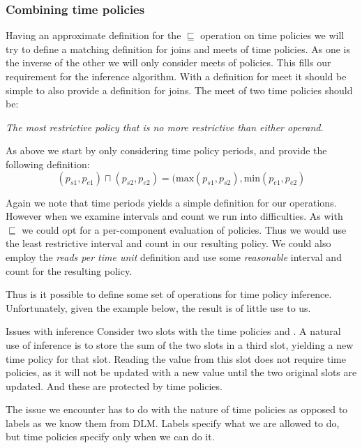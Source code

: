 \subsubsection{Combining time policies}
Having an approximate definition for the $\sqsubseteq$ operation on time policies we will try to define a matching definition for joins and meets of time policies.
As one is the inverse of the other we will only consider meets of policies.
This fills our requirement for the inference algorithm.
With a definition for meet it should be simple to also provide a definition for joins.
The meet of two time policies should be:
\begin{center}
  \textit{The most restrictive policy that is no more restrictive than either operand.}
\end{center}

As above we start by only considering time policy periods, and provide the following definition:
$$(p_{s1}, p_{e1}) \sqcap (p_{s2}, p_{e2}) = (\text{max}(p_{s1}, p_{s2}), \text{min}(p_{e1}, p_{e2})$$

Again we note that time periods yields a simple definition for our operations.
However when we examine intervals and count we run into difficulties.
As with $\sqsubseteq$ we could opt for a per-component evaluation of policies.
Thus we would use the least restrictive interval and count in our resulting policy.
We could also employ the \textit{reads per time unit} definition and use some \textit{reasonable} interval and count for the resulting policy.

Thus is it possible to define some set of operations for time policy inference.
Unfortunately, given the example below, the result is of little use to us.

\begin{example}{Issues with inference}
  Consider two slots with the time policies  and .
  A natural use of inference is to store the sum of the two slots in a third slot, yielding a new time policy for that slot.
  Reading the value from this slot does not require time policies, as it will not be updated with a new value until the two original slots are updated.
  And these are protected by time policies.
\end{example}

The issue we encounter has to do with the nature of time policies as opposed to labels as we know them from DLM.
Labels specify what we are allowed to do, but time policies specify only when we can do it.

